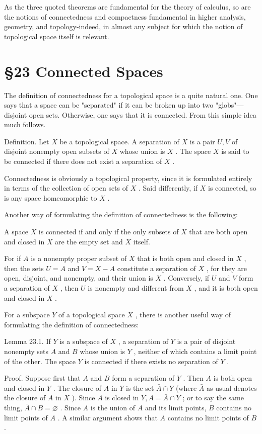 As the three quoted theorems are fundamental for the theory of calculus, so are the notions of connectedness and compactness fundamental in higher analysis, geometry, and topology-indeed, in almost any subject for which the notion of topological space itself is relevant.

\section*{§23 Connected Spaces}

The definition of connectedness for a topological space is a quite natural one. One says that a space can be "separated" if it can be broken up into two "globs"—disjoint open sets. Otherwise, one says that it is connected. From this simple idea much follows.

Definition. Let \(X\) be a topological space. A separation of \(X\) is a pair \(U,V\) of disjoint nonempty open subsets of \(X\) whose union is \(X\) . The space \(X\) is said to be connected if there does not exist a separation of \(X\) .

Connectedness is obviously a topological property, since it is formulated entirely in terms of the collection of open sets of \(X\) . Said differently, if \(X\) is connected, so is any space homeomorphic to \(X\) .

Another way of formulating the definition of connectedness is the following:

A space \(X\) is connected if and only if the only subsets of \(X\) that are both open and closed in \(X\) are the empty set and \(X\) itself.

For if \(A\) is a nonempty proper subset of \(X\) that is both open and closed in \(X\) , then the sets \(U = A\) and \(V = X - A\) constitute a separation of \(X\) , for they are open, disjoint, and nonempty, and their union is \(X\) . Conversely, if \(U\) and \(V\) form a separation of \(X\) , then \(U\) is nonempty and different from \(X\) , and it is both open and closed in \(X\) .

For a subspace \(Y\) of a topological space \(X\) , there is another useful way of formulating the definition of connectedness:

Lemma 23.1. If \(Y\) is a subspace of \(X\) , a separation of \(Y\) is a pair of disjoint nonempty sets \(A\) and \(B\) whose union is \(Y\) , neither of which contains a limit point of the other. The space \(Y\) is connected if there exists no separation of \(Y\) .

Proof. Suppose first that \(A\) and \(B\) form a separation of \(Y\) . Then \(A\) is both open and closed in \(Y\) . The closure of \(A\) in \(Y\) is the set \(\bar{A} \cap  Y\) (where \(\bar{A}\) as usual denotes the closure of \(A\) in \(X\) ). Since \(A\) is closed in \(Y,A = \bar{A} \cap  Y\) ; or to say the same thing, \(\bar{A} \cap  B = \varnothing\) . Since \(A\) is the union of \(A\) and its limit points, \(B\) contains no limit points of \(A\) . A similar argument shows that \(A\) contains no limit points of \(B\) .

